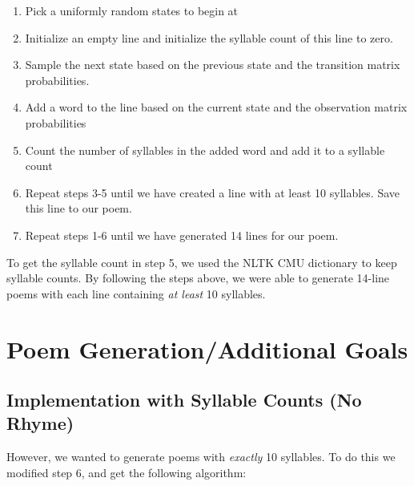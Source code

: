 \begin{enumerate}

\item Pick a uniformly random states to begin at

\item Initialize an empty line and initialize the syllable count of this line to zero.

\item Sample the next state based on the previous state and the transition matrix probabilities.

\item Add a word to the line based on the current state and the observation matrix probabilities

\item Count the number of syllables in the added word and add it to a syllable count

\item Repeat steps 3-5 until we have created a line with at least 10 syllables. Save this line to our poem.

\item Repeat steps 1-6 until we have generated 14 lines for our poem.

\end{enumerate}

To get the syllable count in step 5, we used the NLTK CMU dictionary to keep syllable counts. By following the steps above, we were able to generate 14-line poems with each line containing \textit{at least} 10 syllables. 

\section{Poem Generation/Additional Goals}

\subsection*{Implementation with Syllable Counts (No Rhyme)}

However, we wanted to generate poems with \textit{exactly} 10 syllables. To do this we modified step 6, and get the following algorithm:

